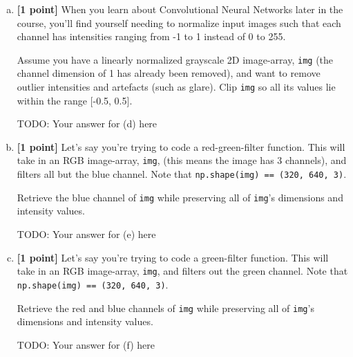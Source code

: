 \begin{enumerate}[(a)]
    \item \textbf{[1 point]} When you learn about Convolutional Neural Networks later in the course, you'll find yourself needing to normalize input images such that each channel has intensities ranging from -1 to 1 instead of 0 to 255.
    
    \begin{tcolorbox}[colback=orange!5!white,colframe=orange!75!black]
    Assume you have a linearly normalized grayscale 2D image-array, \texttt{img} (the channel dimension of 1 has already been removed), and want to remove outlier intensities and artefacts (such as glare). Clip \texttt{img} so all its values lie within the range [-0.5, 0.5].
    \end{tcolorbox}

    \begin{mdframed}
        TODO: Your answer for (d) here
    \end{mdframed}
    
    \item \textbf{[1 point]} Let's say you're trying to code a red-green-filter function. This will take in an RGB image-array, \texttt{img}, (this means the image has 3 channels), and filters all but the blue channel. Note that \texttt{np.shape(img) == (320, 640, 3)}.
    
    \begin{tcolorbox}[colback=orange!5!white,colframe=orange!75!black]
    Retrieve the blue channel of \texttt{img} while preserving all of \texttt{img}'s dimensions and intensity values.
    \end{tcolorbox}
    
    \begin{mdframed}
        TODO: Your answer for (e) here
    \end{mdframed}
    
    \item \textbf{[1 point]} Let's say you're trying to code a green-filter function. This will take in an RGB image-array, \texttt{img}, and filters out the green channel. Note that \texttt{np.shape(img) == (320, 640, 3)}. 
    
    \begin{tcolorbox}[colback=orange!5!white,colframe=orange!75!black]
    Retrieve the red and blue channels of \texttt{img} while preserving all of \texttt{img}'s dimensions and intensity values.
    \end{tcolorbox}
    
    \begin{mdframed}
        TODO: Your answer for (f) here
    \end{mdframed}
    

\end{enumerate}
